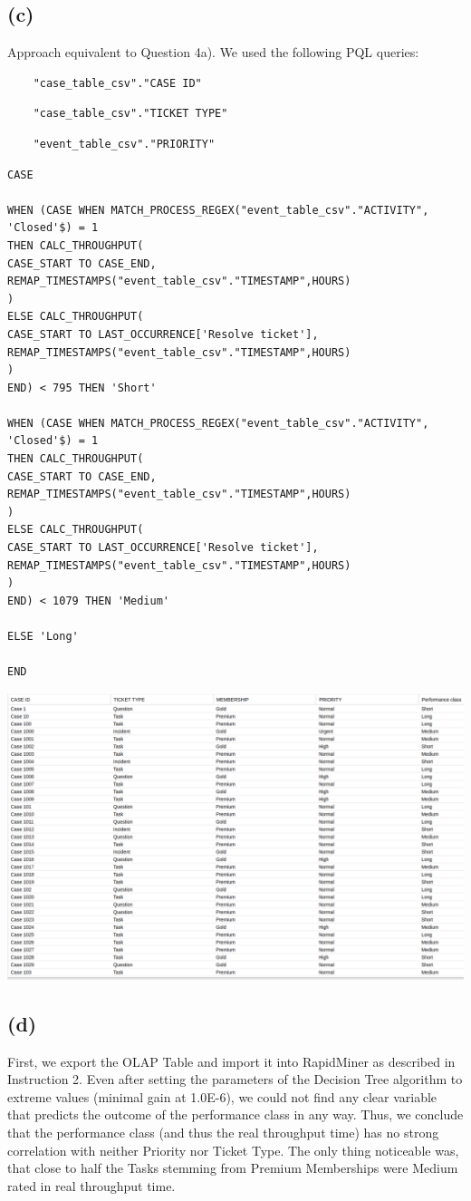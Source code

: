 \documentclass[../../main.tex]{subfiles}
\begin{document}
\subsection*{(c)}
Approach equivalent to Question 4a). We used the following PQL queries:
\begin{verbatim}
	"case_table_csv"."CASE ID"
\end{verbatim}
\begin{verbatim}
	"case_table_csv"."TICKET TYPE"
\end{verbatim}
\begin{verbatim}
	"event_table_csv"."PRIORITY"
\end{verbatim}
\begin{verbatim}
CASE

WHEN (CASE WHEN MATCH_PROCESS_REGEX("event_table_csv"."ACTIVITY", 'Closed'$) = 1
THEN CALC_THROUGHPUT(
CASE_START TO CASE_END,
REMAP_TIMESTAMPS("event_table_csv"."TIMESTAMP",HOURS)
)
ELSE CALC_THROUGHPUT(
CASE_START TO LAST_OCCURRENCE['Resolve ticket'],
REMAP_TIMESTAMPS("event_table_csv"."TIMESTAMP",HOURS)
)
END) < 795 THEN 'Short'

WHEN (CASE WHEN MATCH_PROCESS_REGEX("event_table_csv"."ACTIVITY", 'Closed'$) = 1
THEN CALC_THROUGHPUT(
CASE_START TO CASE_END,
REMAP_TIMESTAMPS("event_table_csv"."TIMESTAMP",HOURS)
)
ELSE CALC_THROUGHPUT(
CASE_START TO LAST_OCCURRENCE['Resolve ticket'],
REMAP_TIMESTAMPS("event_table_csv"."TIMESTAMP",HOURS)
)
END) < 1079 THEN 'Medium'

ELSE 'Long'

END
\end{verbatim}
\includegraphics[width=\columnwidth]{img/Celonis_c_Olap.png}


\subsection*{(d)}
First, we export the OLAP Table and import it into RapidMiner as described in Instruction 2. Even after setting the parameters of the Decision Tree algorithm to extreme values (minimal gain at 1.0E-6), we could not find any clear variable that predicts the outcome of the performance class in any way. Thus, we conclude that the performance class (and thus the real throughput time) has no strong correlation with neither Priority nor Ticket Type. The only thing noticeable was, that close to half the Tasks stemming from Premium Memberships were Medium rated in real throughput time.
\end{document}
